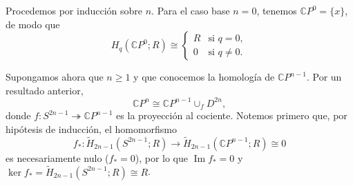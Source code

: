 \begin{dem}
Procedemos por inducción sobre $n$. Para el caso base $n = 0$, tenemos $\mathbb{C}P^0 = \{x\}$, de modo que
\[
H_q(\mathbb{C}P^0; R) \cong
\begin{cases}
R & \text{si } q = 0, \\
0 & \text{si } q \neq 0.
\end{cases}
\]

Supongamos ahora que $n \geq 1$ y que conocemos la homología de $\mathbb{C}P^{n-1}$. Por un resultado anterior,
\[
\mathbb{C}P^n \cong \mathbb{C}P^{n-1} \cup_f D^{2n},
\]
donde $f \colon S^{2n-1} \twoheadrightarrow \mathbb{C}P^{n-1}$ es la proyección al cociente. Notemos primero que, por hipótesis de inducción, el homomorfismo
\[
f_* \colon \widetilde{H}_{2n-1}(S^{2n-1}; R) \longrightarrow \widetilde{H}_{2n-1}(\mathbb{C}P^{n-1}; R) \cong 0
\]
es necesariamente nulo ($f_* = 0$), por lo que $\operatorname{Im} f_* = 0$ y $\ker f_* = \widetilde{H}_{2n-1}(S^{2n-1}; R) \cong R$.


\end{dem}
